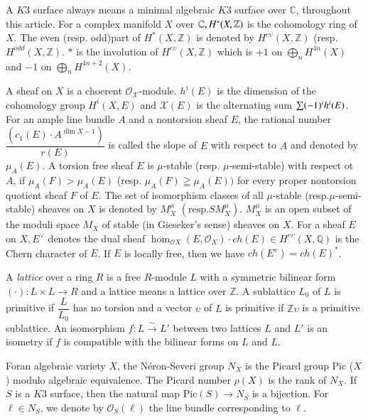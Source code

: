 \begin{notation}
A $K3$ surface always means a minimal algebraic $K3$ surface over
  $\mathbb{C}$, throughout this article. For a complex manifold $X$
  over $\mathbb{C},\\H^{\ast}(X,\mathbb{Z})$ is the cohomology ring of
  $X$. The even (resp. odd)\pageoriginale part of $H^{\ast}(X,\mathbb{Z})$ is
  denoted by $H^{e\upsilon}(X,\mathbb{Z})$
  (resp. $H^{odd}(X,\mathbb{Z})$. $\ast$ is the involution of
  $H^{e\upsilon}(X,\mathbb{Z})$ which is $+1$ on
  $\bigoplus\limits_{n}H^{4n}(X)$ and $-1$ on
  $\bigoplus\limits_{n}H^{4n+2}(X)$. 

A sheaf on $X$ is a choerent
$\mathscr{O}_{\mathcal{X}}$-module. $h^{i}(E)$ is the dimension of the
cohomology group $H^{i}(X,E)$ and $\mathcal{X}(E)$ is the alternating
sum $\sum(-1)^{i}\\h^{i}(E)$. For an ample line bundle $A$ and a
nontorsion sheaf $E$, the rational number $\dfrac{(c_1(E)\cdot A^{\dim
  X-1})}{r(E)}$ is called the slope of $E$ with respect to $A$ and
denoted by $\mu_A(E)$. A torsion free sheaf $E$ is $\mu$-stable
(resp. $\mu$-semi-stable) with respect ot $A$, if $\mu_A(F)>\mu_A(E)$
(resp. $\mu_A(F)\geqq \mu_A(E))$ for every proper nontorsion quotient
sheaf $F$ of $E$. The set of isomorphism classes of all $\mu$-stable
(resp.$\mu$-semi-stable) sheaves on $X$ is denoted by $M^{\mu}_X$
$\left(\text{resp.} SM^{\mu}_X\right)$. $M^{\mu}_{X}$ is an open subset of the moduli
space $M_X$ of stable (in Gieseker's sense) sheaves on $X$. For a
sheaf $E$ on $X,E^{\vee}$ denotes the dual sheaf
$\hom_{\mathscr{O}X}(E,\mathscr{O}_X)\cdot ch(E)\in
H^{e\upsilon}(X,\mathbb{Q})$ is the Chern character of $E$. If $E$ is locally
free, then we have $ch(E^{v})=ch(E)^{\ast}$. 

A \textit{lattice} over a ring $R$ is a free $R$-module $L$ with a symmetric
bilinear form $(\cdot):L\times L\to R$ and a lattice means a lattice
over $\mathbb{Z}$. A sublattice $L_0$ of $L$ is primitive if
$\dfrac{L}{L_0}$ has no torsion and a vector $\upsilon$ of $L$ is
primitive if $\mathbb{Z} \upsilon$ is a primitive sublattice. An
isomorphism $f:L\xrightarrow{\sim}L'$ between two lattices $L$ and
$L'$ is an isometry if $f$ is compatible with the bilinear forms on
$L$ and $L$. 

For\pageoriginale an algebraic variety $X$, the N\'{e}ron-Severi group
$N_X$ is the Picard group Pic ($X$) modulo algebraic equivalence. The
Picard number $\rho(X)$ is the rank of $N_X$. If $S$ is a $K3$
surface, then the natural map Pic$(S)\to N_S$   is a bijection. For
$\ell \in N_S$, we denote by $\mathscr{O}_S(\ell)$ the line bundle
corresponding to $\ell$. 
\end{notation}



